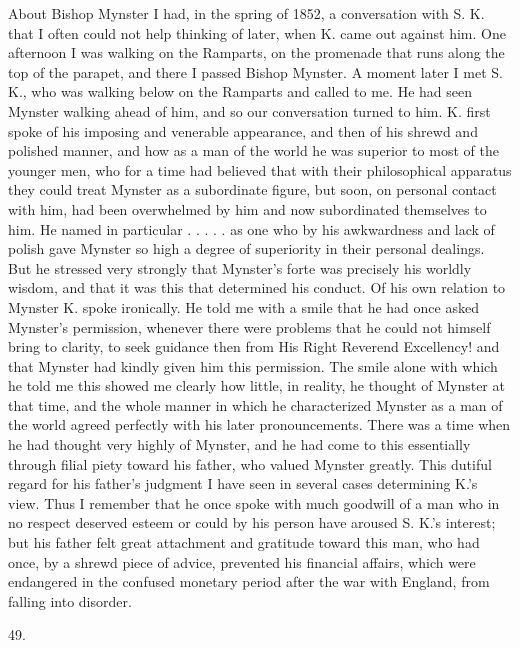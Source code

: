 \documentclass[12pt,a4paper,openany]{book}
\newcommand{\secnum}[1]{\par\begin{center}#1\end{center}\par\nobreak}
\newcommand{\opage}[1]{\marginnote{\footnotesize\textit{[#1]}}}
\begin{document}
About Bishop Mynster I had, in the spring of 1852, a conversation with S. K.
that I often could not help thinking of later, when K. came out against him.
One afternoon I was walking on the Ramparts, on the promenade that runs along
the top of the parapet, and there I passed Bishop Mynster. A moment later I met
S. K., who was walking below on the Ramparts and called to me. He had seen
Mynster walking ahead of him, and so our conversation turned to him. K. first
spoke of his imposing and venerable appearance, and then of his shrewd and
polished manner, and how as a man of the world he was superior to most of the
younger men, who for a time had believed that with their philosophical
apparatus they could treat Mynster as a subordinate figure, but soon, on
personal contact with him, had been overwhelmed by him and now subordinated
themselves to him. He named in particular
. . . . . as one who by his awkwardness and lack of polish gave Mynster so
high a degree of
\opage{372}superiority in their personal dealings. But he stressed very
strongly that Mynster's forte was precisely his worldly wisdom, and that it
was this that determined his conduct. Of his own relation to Mynster K. spoke
ironically. He told me with a smile that he had once asked Mynster's
permission, whenever there were problems that he could not himself bring to
clarity, to seek guidance then from His Right Reverend Excellency! and that
Mynster had kindly given him this permission. The smile alone with which he
told me this showed me clearly how little, in reality, he thought of Mynster
at that time, and the whole manner in which he characterized Mynster as a man
of the world agreed perfectly with his later pronouncements. There was a time
when he had thought very highly of Mynster, and he had come to this
essentially through filial piety toward his father, who valued Mynster
greatly. This dutiful regard for his father's judgment I have seen in several
cases determining K.'s view. Thus I remember that he once spoke with much
goodwill of a man who in no respect deserved esteem or could by his person
have aroused S. K.'s interest; but his father felt great attachment and
gratitude toward this man, who had once, by a shrewd piece of advice,
prevented his financial affairs, which were endangered in the confused
monetary period after the war with England, from falling into disorder.

\secnum{49.}
\end{document}
